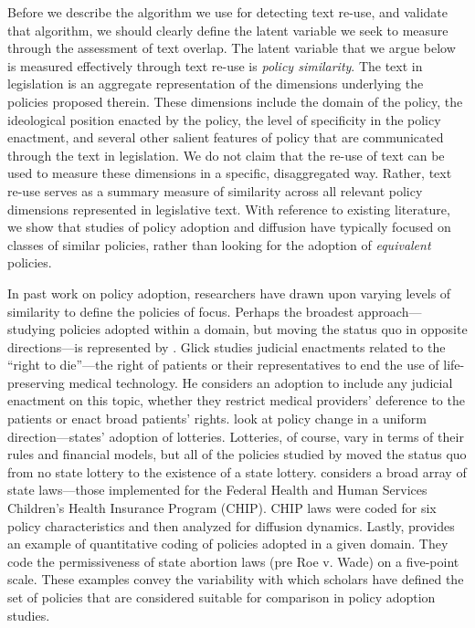 \documentclass[12pt]{article} %
\begin{document}
Before we describe the algorithm we use for detecting text re-use, and validate that algorithm, we should clearly define the latent variable we seek to measure through the assessment of text overlap. The latent variable that we argue below is measured effectively through text re-use is {\em policy similarity}. The text in legislation is an aggregate representation of the dimensions underlying the policies proposed therein. These dimensions include the domain of the policy, the ideological position enacted by the policy, the level of specificity in the policy enactment, and several other salient features of policy that are communicated through the text in legislation. We do not claim that the re-use of text can be used to measure these dimensions in a specific, disaggregated way. Rather, text re-use serves as a summary measure of similarity across all relevant policy dimensions represented in legislative text. With reference to existing literature, we show that studies of policy adoption and diffusion have typically focused on classes of similar policies, rather than looking for the adoption of {\em equivalent} policies.

In past work on policy adoption, researchers have drawn upon varying levels of similarity to define the policies of focus. Perhaps the broadest approach---studying policies adopted within a domain, but moving the status quo in opposite directions---is represented by \citet{glick1992judicial}. Glick studies judicial enactments related to the ``right to die''---the right of patients or their representatives to end the use of life-preserving medical technology. He considers an adoption to include any judicial enactment on this topic, whether they restrict medical providers' deference to the patients or enact broad patients' rights.  \citet{berry1990} look at policy change in a uniform direction---states' adoption of lotteries. Lotteries, of course, vary in terms of their rules and financial models, but all of the policies studied by \citet{berry1990} moved the status quo from no state lottery to the existence of a state lottery. \citet{volden2006} considers a broad array of state laws---those implemented for the Federal Health and Human Services Children's Health Insurance Program (CHIP). CHIP laws were coded for six policy characteristics and then analyzed for diffusion dynamics. Lastly, \citet{mooney1995legislative} provides an example of quantitative coding of policies adopted in a given domain. They code the permissiveness of state abortion laws (pre Roe v. Wade) on a five-point scale. These examples convey the variability with which scholars have defined the set of policies that are considered suitable for comparison in policy adoption studies.
\end{document}
